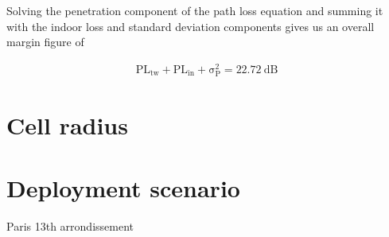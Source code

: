 \documentclass{article}
\begin{document}
Solving the penetration component of the path loss equation and summing it with the indoor loss and standard deviation components gives us an overall margin figure of

\begin{gather*}
    \mathrm{PL_{tw} + \mathrm{PL_{in} + \sigma^2_P = \SI{22.72}{\deci\bel}}}
\end{gather*}

\section{Cell radius}
\label{cell_r}

\section{Deployment scenario}
Paris 13th arrondissement
\end{document}
